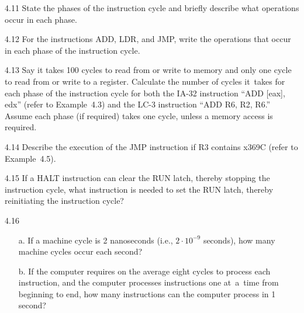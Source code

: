 \documentclass{patt}
\begin{document}
\begin{exercises}
\vspace{12pt}
\medskip

\item[4.11]
State the phases of the instruction cycle and briefly describe what operations
occur in each phase.

\item[4.12]
For the instructions ADD, LDR, and JMP, write the operations that occur in each
phase of the instruction cycle.

\item[4.13]
Say it takes 100 cycles
to read from or write to memory and only one cycle to read from or write to
a register. Calculate the number of cycles it~takes for each phase of the
instruction cycle for both the IA-32 instruction ``ADD [eax], edx''
(refer to Example~4.3) and the LC-3 instruction ``ADD R6, R2, R6.''
Assume each phase (if required) takes one cycle,  unless a memory access
is required.

\item[4.14]
Describe the execution of the JMP instruction
if R3 contains x369C (refer to Example~4.5).

\item[4.15]
If a HALT instruction can clear the RUN latch, thereby stopping the instruction
cycle, what instruction is needed to set the RUN latch, thereby reinitiating
the instruction cycle?

\item[4.16]
\begin{enumerate}
\item[a.] If a machine cycle is 2 nanoseconds (i.e., $2\cdot 10^{-9}$
  seconds), how many machine cycles occur each second?

\item[b.] If the computer requires on the average eight cycles to
  process each instruction, and the computer processes instructions
  one at~a~time from beginning to end, how many instructions can the
  computer process in 1 second?

\enlargethispage{-\baselineskip}


\end{enumerate}
\end{exercises}
\end{document}
